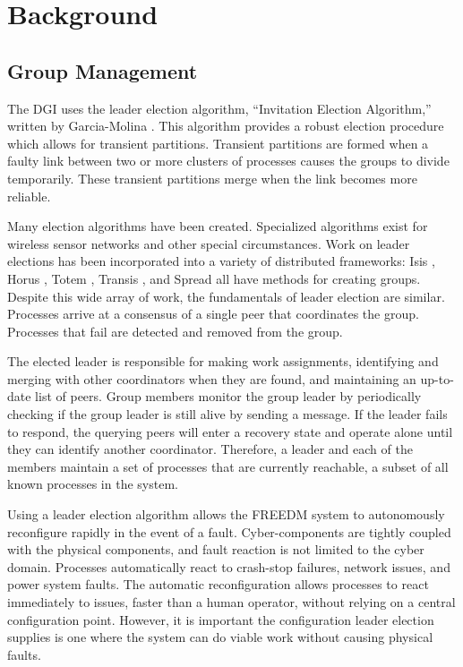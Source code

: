 \section{Background}

\subsection{Group Management}

The DGI uses the leader election algorithm, ``Invitation Election Algorithm,'' written by Garcia-Molina \cite{INVITATIONELECTION}.
This algorithm provides a robust election procedure which allows for transient partitions.
Transient partitions are formed when a faulty link between two or more clusters of processes causes the groups to divide temporarily.
These transient partitions merge when the link becomes more reliable.

Many election algorithms have been created.
Specialized algorithms exist for wireless sensor networks \cite{LE-WSN-1}\cite{LE-WSN-2} and other special circumstances\cite{LE-SPECIALCIRCUMSTANCES-1}\cite{LE-SPECIALCIRCUMSTANCES-2}.
Work on leader elections has been incorporated into a variety of distributed frameworks: Isis \cite{ISISTOOLKIT}, Horus \cite{HORUSTOOLKIT}, Totem \cite{TOTEMTOOLKIT}, Transis \cite{TRANSISTOOLKIT}, and Spread \cite{SPREADTOOLKIT} all have methods for creating groups.
Despite this wide array of work, the fundamentals of leader election are similar.
Processes arrive at a consensus of a single peer that coordinates the group.
Processes that fail are detected and removed from the group.

The elected leader is responsible for making work assignments, identifying and merging with other coordinators when they are found, and maintaining an up-to-date list of peers.
Group members monitor the group leader by periodically checking if the group leader is still alive by sending a message.
If the leader fails to respond, the querying peers will enter a recovery state and operate alone until they can identify another coordinator.
Therefore, a leader and each of the members maintain a set of processes that are currently reachable, a subset of all known processes in the system.

Using a leader election algorithm allows the FREEDM system to autonomously reconfigure rapidly in the event of a fault.
Cyber-components are tightly coupled with the physical components, and fault reaction is not limited to the cyber domain.
Processes automatically react to crash-stop failures, network issues, and power system faults.
The automatic reconfiguration allows processes to react immediately to issues, faster than a human operator, without relying on a central configuration point.
However, it is important the configuration leader election supplies is one where the system can do viable work without causing physical faults\cite{HARINI}.

